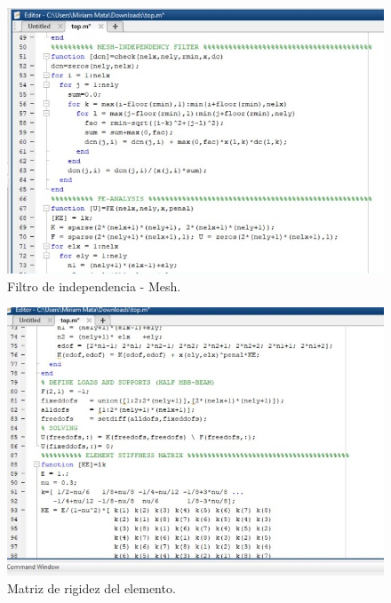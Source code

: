 \documentclass{article}
\begin{document}
\begin{figure}[htp] %
    \centering
    \includegraphics[width=140mm]{Codigo 3.jpeg} %
    \caption{Filtro de independencia - Mesh.}
    \label{grafica}
\end{figure}
\begin{figure}[htp] %
    \centering
    \includegraphics[width=140mm]{Codigo 4.jpeg} %
    \caption{Matriz de rigidez del elemento.}
    \label{grafica}
\end{figure}
\newpage
\end{document}
